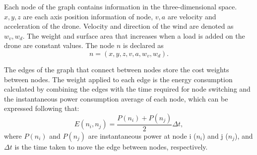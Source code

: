 \documentclass[journal]{./template/IEEEtran}
\begin{document}

Each node of the graph contains information in the three-dimensional space. $x,y,z$ are each axis position information of node, $v,a$ are velocity and acceleration of the drone. 
Velocity and direction of the wind are denoted as $w_v,w_d$. The weight and surface area that increases when a load is added on the drone are constant values.
The node $n$ is declared as 
\begin{equation*}
n = (x, y, z, v, a, w_v, w_d).
\end{equation*}

The edges of the graph that connect between nodes store the cost weights between nodes.
The weight applied to each edge is the energy consumption calculated by combining the edges with the time required for node switching and the instantaneous power consumption average of each node, which can be expressed following that: 
\begin{equation*}
E(n_i, n_j) = \frac{P(n_i)+P(n_j)}{2} \Delta t,
\end{equation*}
where $P(n_i)$ and $P(n_j)$ are instantaneous power at node i ($n_i$) and j ($n_j$), and $\Delta t$ is the time taken to move the edge between nodes, respectively.
\end{document}
